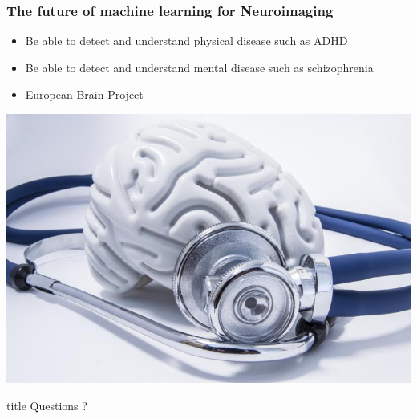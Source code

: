 \documentclass{beamer}
\begin{document}
\begin{frame}
\frametitle{The future of machine learning for Neuroimaging}
\begin{itemize}
\item Be able to detect and understand physical disease such as ADHD
\item Be able to detect and understand mental disease such as schizophrenia
\item European Brain Project
\end{itemize}
\centering
\includegraphics[scale=0.27]{future.png}
\end{frame}


\begin{frame}
\vfill
\centering
\begin{beamercolorbox}[sep=8pt,center,shadow=true,rounded=true]{title}
Questions ?
\end{beamercolorbox}
\vfill
\end{frame}




\end{document}
